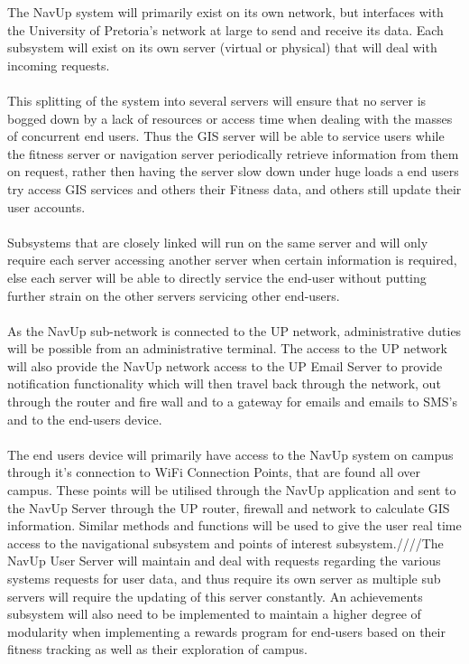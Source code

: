 \documentclass{article}
\begin{document}
			{The NavUp system will primarily exist on its own network, but interfaces with the University of Pretoria's network at large to send and receive its data. Each subsystem will exist on its own server (virtual or physical) that will deal with incoming requests.\\\\This splitting of the system into several servers will ensure that no server is bogged down by a lack of resources or access time when dealing with the masses of concurrent end users. Thus the GIS server will be able to service users while the fitness server or navigation server periodically retrieve information from them on request, rather then having the server slow down under huge loads a end users try access GIS services and others their Fitness data, and others still update their user accounts.\\\\Subsystems that are closely linked will run on the same server and will only require each server accessing another server when certain information is required, else each server will be able to directly service the end-user without putting further strain on the other servers servicing other end-users.\\\\As the NavUp sub-network is connected to the UP network, administrative duties will be possible from an administrative terminal. The access to the UP network will also provide the NavUp network access to the UP Email Server to provide notification functionality which will then travel back through the network, out through the router and fire wall and to a gateway for emails and emails to SMS's and to the end-users device.\\\\The end users device will primarily have access to the NavUp system on campus through it's connection to WiFi Connection Points, that are found all over campus. These points will be utilised through the NavUp application and sent to the NavUp Server through the UP router, firewall and network to calculate GIS information. Similar methods and functions will be used to give the user real time access to the navigational subsystem and points of interest subsystem.////The NavUp User Server will maintain and deal with requests regarding the various systems requests for user data, and thus require its own server as multiple sub servers will require the updating of this server constantly. An achievements subsystem will also need to be implemented to maintain a higher degree of modularity when implementing a rewards program for end-users based on their fitness tracking as well as their exploration of campus.}
\end{document}
